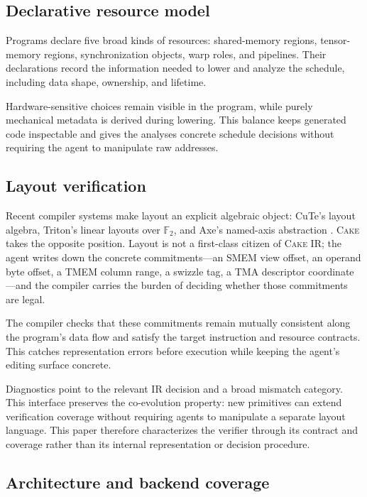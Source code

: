 \documentclass[11pt]{article}
\newcommand{\cake}{\textsc{Cake}}
\newcommand{\cakeir}{\textsc{Cake IR}}
\begin{document}
\subsection{Declarative resource model}

Programs declare five broad kinds of resources: shared-memory regions,
tensor-memory regions, synchronization objects, warp roles, and pipelines.
Their declarations record the information needed to lower and analyze the
schedule, including data shape, ownership, and lifetime.

Hardware-sensitive choices remain visible in the program, while purely
mechanical metadata is derived during lowering. This balance keeps generated
code inspectable and gives the analyses concrete schedule decisions without
requiring the agent to manipulate raw addresses.

\subsection{Layout verification}
\label{app:layout}

Recent compiler systems make layout an explicit algebraic object: CuTe's layout
algebra, Triton's linear layouts over $\mathbb{F}_2$, and Axe's named-axis
abstraction \cite{cecka2026cute,zhou2025linear,hou2026axe}. \cake{} takes the
opposite position. Layout is not a first-class citizen of \cakeir{}; the agent
writes down the concrete commitments---an SMEM view offset, an operand byte
offset, a TMEM column range, a swizzle tag, a TMA descriptor coordinate---and
the compiler carries the burden of deciding whether those commitments are legal.

The compiler checks that these commitments remain mutually consistent along the
program's data flow and satisfy the target instruction and resource contracts.
This catches representation errors before execution while keeping the agent's
editing surface concrete.

Diagnostics point to the relevant IR decision and a broad mismatch category.
This interface preserves the co-evolution property: new primitives can extend
verification coverage without requiring agents to manipulate a separate layout
language. This paper therefore characterizes the verifier through its contract
and coverage rather than its internal representation or decision procedure.

\subsection{Architecture and backend coverage}
\label{app:architecture}
\end{document}

